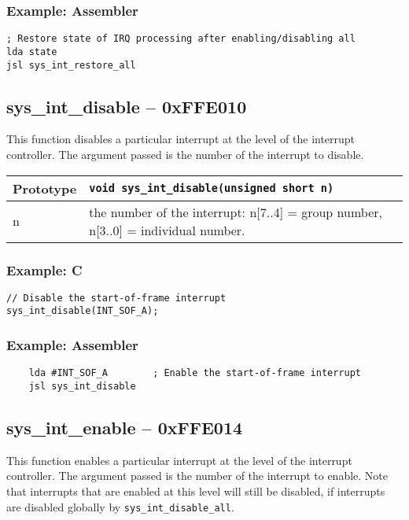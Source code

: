 \subsubsection*{Example: Assembler}
\begin{verbatim}
; Restore state of IRQ processing after enabling/disabling all
lda state
jsl sys_int_restore_all
\end{verbatim}

\subsection*{sys\_int\_disable -- 0xFFE010}
This function disables a particular interrupt at the level of the interrupt controller. The argument passed is the number of the interrupt to disable.

\bigskip

\begin{tabular}{|l||l|} \hline
Prototype & \lstinline!void sys_int_disable(unsigned short n)! \\ \hline
n & the number of the interrupt: n[7..4] = group number, n[3..0] = individual number. \\ \hline
\end{tabular}

\subsubsection*{Example: C}
\begin{lstlisting}
// Disable the start-of-frame interrupt
sys_int_disable(INT_SOF_A);
\end{lstlisting}

\subsubsection*{Example: Assembler}
\begin{verbatim}
    lda #INT_SOF_A        ; Enable the start-of-frame interrupt
    jsl sys_int_disable
\end{verbatim}

\subsection*{sys\_int\_enable -- 0xFFE014}
This function enables a particular interrupt at the level of the interrupt controller.
The argument passed is the number of the interrupt to enable. Note that interrupts that are enabled at this level will still be disabled,
if interrupts are disabled globally by \verb+sys_int_disable_all+.

